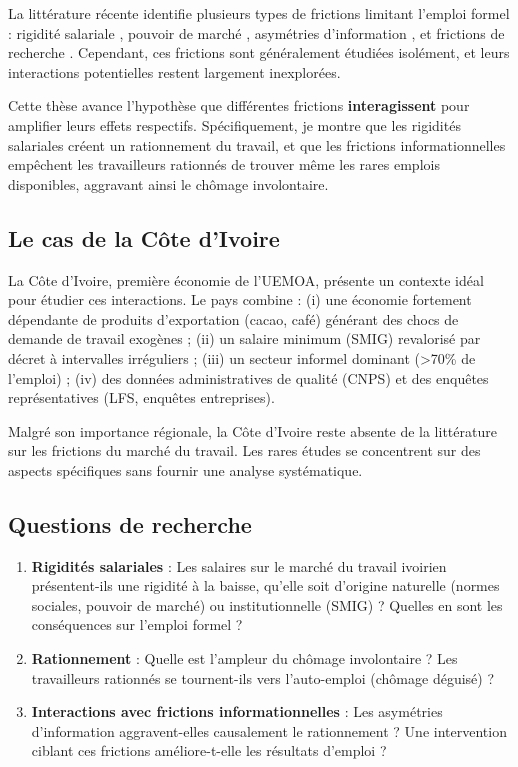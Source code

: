 \documentclass[12pt,a4paper]{article}
\begin{document}
La littérature récente identifie plusieurs types de frictions limitant l'emploi formel : rigidité salariale \citep{kaur2019}, pouvoir de marché \citep{breza2022, muralidharan2023}, asymétries d'information \citep{carranza2022}, et frictions de recherche \citep{abebe2021}. Cependant, ces frictions sont généralement étudiées isolément, et leurs interactions potentielles restent largement inexplorées.

Cette thèse avance l'hypothèse que différentes frictions \textbf{interagissent} pour amplifier leurs effets respectifs. Spécifiquement, je montre que les rigidités salariales créent un rationnement du travail, et que les frictions informationnelles empêchent les travailleurs rationnés de trouver même les rares emplois disponibles, aggravant ainsi le chômage involontaire.

\subsection{Le cas de la Côte d'Ivoire}

La Côte d'Ivoire, première économie de l'UEMOA, présente un contexte idéal pour étudier ces interactions. Le pays combine : (i) une économie fortement dépendante de produits d'exportation (cacao, café) générant des chocs de demande de travail exogènes ; (ii) un salaire minimum (SMIG) revalorisé par décret à intervalles irréguliers ; (iii) un secteur informel dominant (>70\% de l'emploi) ; (iv) des données administratives de qualité (CNPS) et des enquêtes représentatives (LFS, enquêtes entreprises).

Malgré son importance régionale, la Côte d'Ivoire reste absente de la littérature sur les frictions du marché du travail. Les rares études \citep{donald2024, carranza2022a} se concentrent sur des aspects spécifiques sans fournir une analyse systématique.

\subsection{Questions de recherche}

\begin{enumerate}
    \item \textbf{Rigidités salariales} : Les salaires sur le marché du travail ivoirien présentent-ils une rigidité à la baisse, qu'elle soit d'origine naturelle (normes sociales, pouvoir de marché) ou institutionnelle (SMIG) ? Quelles en sont les conséquences sur l'emploi formel ?

    \item \textbf{Rationnement} : Quelle est l'ampleur du chômage involontaire ? Les travailleurs rationnés se tournent-ils vers l'auto-emploi (chômage déguisé) ?

    \item \textbf{Interactions avec frictions informationnelles} : Les asymétries d'information aggravent-elles causalement le rationnement ? Une intervention ciblant ces frictions améliore-t-elle les résultats d'emploi ?
\end{enumerate}
\end{document}
